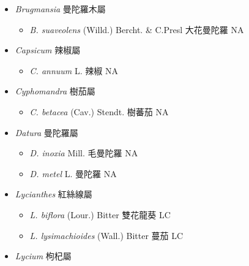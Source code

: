
  \begin{itemize}
 \item[] \textit{Brugmansia} 曼陀羅木屬
                                
  \begin{itemize}
        \item[] \textit{B. suaveolens} (Willd.) Bercht. \& C.Presl  大花曼陀羅   NA
  \end{itemize}
 \item[] \textit{Capsicum} 辣椒屬
                                
  \begin{itemize}
        \item[] \textit{C. annuum} L.  辣椒   NA
  \end{itemize}
 \item[] \textit{Cyphomandra} 樹茄屬
                                
  \begin{itemize}
        \item[] \textit{C. betacea} (Cav.) Stendt.  樹蕃茄   NA
  \end{itemize}
 \item[] \textit{Datura} 曼陀羅屬
                                
  \begin{itemize}
        \item[] \textit{D. inoxia} Mill.  毛曼陀羅   NA
        \item[] \textit{D. metel} L.  曼陀羅   NA
  \end{itemize}
 \item[] \textit{Lycianthes} 紅絲線屬
                                
  \begin{itemize}
        \item[] \textit{L. biflora} (Lour.) Bitter  雙花龍葵   LC
        \item[] \textit{L. lysimachioides} (Wall.) Bitter  蔓茄   LC
  \end{itemize}
 \item[] \textit{Lycium} 枸杞屬
                                

\end{itemize}
